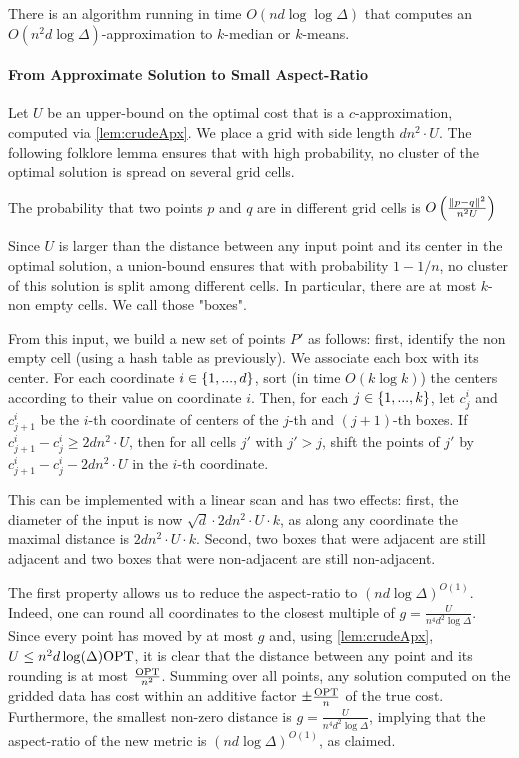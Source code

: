 \begin{lemma}\label{lem:crudeApx}
There is an algorithm running in time $O(nd \log \log \Delta)$ that computes an  $O(n^2 d \log \Delta)$-approximation to $k$-median or $k$-means.
\end{lemma}

\paragraph*{From Approximate Solution to Small Aspect-Ratio}
Let $U$ be an upper-bound on the optimal cost that is a $c$-approximation, computed via \cref{lem:crudeApx}. We place a grid with side length $d n^2\cdot U$.
The following folklore lemma ensures that with high probability, no cluster of the optimal solution is spread on several grid cells.

\begin{lemma}
The probability that two points $p$ and $q$ are in different grid cells is $O\left( \frac{\|p-q\|^2}{n^2 U}\right)$
\end{lemma}

Since $U$ is larger than the distance between any input point and its center in the optimal solution, a union-bound ensures that with probability $1-1/n$, no
cluster of this solution is split among different cells.  In particular, there are at most $k$-non empty cells. We call those "boxes".

From this input, we build a new set of points $P'$ as follows: first, identify the non empty cell (using a hash table as previously). We associate each box with
its center.  For each coordinate $i \in \left\{ 1, ..., d \right\}$, sort (in time $O(k \log k)$) the centers according to their value on coordinate $i$. Then, for
each $j \in \left\{ 1, ..., k\right\}$, let $c^i_j$ and $c^i_{j+1}$ be the $i$-th coordinate of centers of the $j$-th and $(j+1)$-th boxes. If $c^i_{j+1} - c^i_j
\geq 2d n^2\cdot U$, then for all cells $j'$ with $j' > j$, shift the points of $j'$ by $c^i_{j+1} - c^i_j - 2d n^2\cdot U$ in the $i$-th coordinate.

This can be implemented with a linear scan and has two effects: first, the diameter of the input is now $\sqrt{d} \cdot 2d n^2\cdot U \cdot k$, as along any
coordinate the maximal distance is $2d n^2\cdot U \cdot k$. Second, two boxes that were adjacent are still adjacent and two boxes that were non-adjacent are
still non-adjacent.

The first property allows us to reduce the aspect-ratio to $(nd \log \Delta)^{O(1)}$.  Indeed, one can round all coordinates to the closest multiple of
$g = \frac{U}{n^4 d^{2} \log \Delta}$. Since every point has moved by at most $g$ and, using \cref{lem:crudeApx}, $U
\leq n^2 d \log(\Delta) \text{OPT}$, it is clear that the distance between any point and its rounding is at most $\frac{\text{OPT}}{n^2}$. Summing over all points,
any solution computed on the gridded data has cost within an additive factor $\pm \frac{\text{OPT}}{n}$ of the true cost. Furthermore, the smallest
non-zero distance is $g = \frac{U}{n^4 d^{2} \log \Delta}$, implying that the aspect-ratio of the new metric is $(nd \log \Delta)^{O(1)}$,
as claimed.

